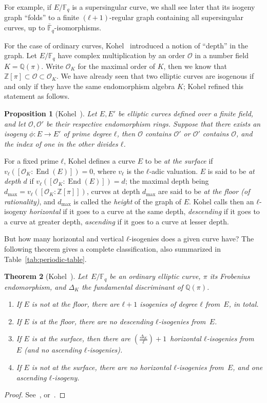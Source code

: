 \documentclass[10pt]{article}
\theoremstyle{plain}
\newtheorem{theorem}{Theorem}
\newtheorem{proposition}[theorem]{Proposition}
\theoremstyle{definition}
\DeclareMathOperator{\End}{End} %
\def\F{\ensuremath{\mathbb{F}}}
\def\O{\ensuremath{\mathcal{O}}}
\begin{document}
For example, if $E/\F_q$ is a supersingular curve, we shall see later
that its isogeny graph ``folds'' to a finite $(ℓ+1)$-regular graph
containing all supersingular curves, up to $\bar{\F}_q$-isomorphisms.

For the case of ordinary curves, Kohel~\cite{kohel} introduced a
notion of ``depth'' in the graph. %
Let $E/\F_q$ have complex multiplication by an order $\O$ in a number
field $K=ℚ(π)$. %
Write $\O_K$ for the maximal order of $K$, then we know that
$ℤ[π] ⊂ \O ⊂ \O_K$. %
We have already seen that two elliptic curves are isogenous if and
only if they have the same endomorphism algebra $K$; Kohel refined
this statement as follows.

\begin{proposition}[{Kohel~\cite[Prop.~21]{kohel}}]
  Let $E,E'$ be elliptic curves defined over a finite field, and let
  $\O,\O'$ be their respective endomorphism rings. %
  Suppose that there exists an isogeny $ϕ:E→E'$ of prime degree $ℓ$,
  then $\O$ contains $\O'$ or $\O'$ contains $\O$, and the index of
  one in the other divides $ℓ$.
\end{proposition}

For a fixed prime $ℓ$, Kohel defines a curve $E$ to be \emph{at the
  surface} if $v_ℓ([\O_K:\End(E)])=0$, where $v_ℓ$ is the $ℓ$-adic
valuation. %
$E$ is said to be \emph{at depth $d$} if $v_ℓ([\O_K:\End(E)])=d$; the
maximal depth being $d_{\max}=v_ℓ([\O_K:ℤ[π]])$, curves at depth
$d_{\max}$ are said to be \emph{at the floor (of rationality)}, and
$d_{\max}$ is called the \emph{height} of the graph of $E$. %
Kohel calls then an $ℓ$-isogeny \emph{horizontal} if it goes to a
curve at the same depth, \emph{descending} if it goes to a curve at
greater depth, \emph{ascending} if it goes to a curve at lesser
depth. %

But how many horizontal and vertical $ℓ$-isogenies does a given curve
have?  %
The following theorem gives a complete classification, also summarized
in Table~\ref{tab:periodic-table}. %

\begin{theorem}[{Kohel~\cite{kohel}}]
  \label{prop:isogeny-count}
  Let~$E/\F_q$ be an ordinary elliptic curve, $π$ its Frobenius
  endomorphism, and $Δ_K$ the fundamental discriminant of $ℚ(π)$. %
  \begin{enumerate}
  \item If $E$ is not at the floor, there are $ℓ+1$ isogenies of
    degree $ℓ$ from~$E$, in total.
  \item If $E$ is at the floor, there are no descending $ℓ$-isogenies
    from~$E$.
  \item If $E$ is at the surface, then there are
    $\left(\frac{Δ_K}{ℓ}\right)+1$~horizontal $ℓ$-isogenies from~$E$
    (and no ascending $ℓ$-isogenies).
  \item If $E$ is not at the surface, there are no horizontal
    $ℓ$-isogenies from~$E$, and one ascending $ℓ$-isogeny.
  \end{enumerate}
\end{theorem}
\begin{proof}
  See~\cite[Prop.~21]{kohel}, or~\cite[Lecture~23]{sutherland-notes}.
\end{proof}
\end{document}
